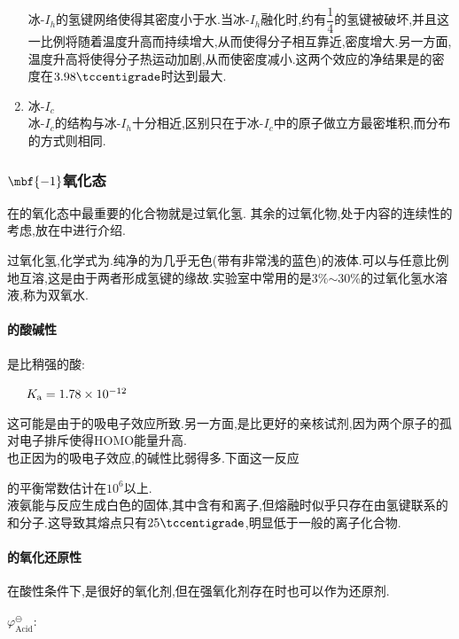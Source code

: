 \documentclass{ctexart}
\begin{document}
\begin{enumerate}[label=\tbf{\arabic*},topsep=0pt,parsep=0pt,itemsep=0pt,partopsep=0pt]
\begin{derivation}
        \end{derivation}
        冰-$I_h$的氢键网络使得其密度小于水.当冰-$I_h$融化时,约有$\dfrac14$的氢键被破坏,并且这一比例将随着温度升高而持续增大,从而使得分子相互靠近,密度增大.另一方面,温度升高将使得分子热运动加剧,从而使密度减小.这两个效应的净结果是的密度在$3.98\tccentigrade$时达到最大.
    \item 冰-$I_c$\\
        冰-$I_c$的结构与冰-$I_h$十分相近,区别只在于冰-$I_c$中的原子做立方最密堆积,而分布的方式则相同.
\end{enumerate}
\subsubsection{$\mbf{-1}$氧化态}
在的氧化态中最重要的化合物就是过氧化氢.%
其余的过氧化物,处于内容的连续性的考虑,放在中进行介绍.
\begin{substance}[\ce{H2O2}]
    过氧化氢,化学式为.纯净的为几乎无色(带有非常浅的蓝色)的液体.可以与任意比例地互溶,这是由于两者形成氢键的缘故.实验室中常用的是3\%$\sim$30\%的过氧化氢水溶液,称为双氧水.
\end{substance}
\paragraph{的酸碱性}
是比稍强的酸:
\begin{center}
    \ \ \ $K_\text a=1.78\times10^{-12}$
\end{center}
这可能是由于的吸电子效应所致.另一方面,是比更好的亲核试剂,因为两个原子的孤对电子排斥使得HOMO能量升高.\\
\indent 也正因为的吸电子效应,的碱性比弱得多.下面这一反应
\begin{center}
\end{center}
的平衡常数估计在$10^6$以上.\\
\indent 液氨能与反应生成白色的固体,其中含有和离子,但熔融时似乎只存在由氢键联系的和分子.这导致其熔点只有$25\tccentigrade$,明显低于一般的离子化合物.
\paragraph{的氧化还原性}在酸性条件下,是很好的氧化剂,但在强氧化剂存在时也可以作为还原剂.
\begin{center}
    $\varphi^\ominus_{\text{Acid}}$:\ \ \ 
\end{center}
\end{document}
